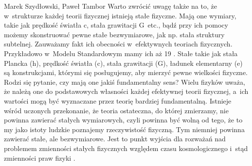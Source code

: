 \begin{artplenv2auth}{Marek Szydłowski, Paweł Tambor}
Warto zwrócić uwagę także na to, że w~strukturze każdej teorii fizycznej istnieją stałe fizyczne. Mają one wymiary, takie jak prędkość światła c, stała grawitacji G~etc., bądź przy ich pomocy możemy skonstruować pewne stałe bezwymiarowe, jak np. stała struktury subtelnej. Zauważamy fakt ich obecności w~efektywnych teoriach fizycznych. Przykładowo w~Modelu Standardowym mamy ich aż 19
\parencite[][]{duff_how_2014}. %
 Stałe takie jak stała Plancka (h), prędkość światła (c), stała grawitacji (G), ładunek elementarny (e) są konstrukcjami, którymi się posługujemy, aby mierzyć pewne wielkości fizyczne. Rodzi się pytanie, czy mają one jakiś fundamentalny sens? Wielu fizyków uważa, że należą one do podstawowych własności każdej efektywnej teorii fizycznej, a~ich wartości mogą być wyznaczane przez teorię bardziej fundamentalną. Istnieje wśród uczonych przekonanie, że teoria ostateczna, do której zmierzamy, nie powinna zawierać stałych wymiarowych, czyli powinna być wolną od tego, że to my jako istoty ludzkie poznajemy rzeczywistość fizyczną. Tym niemniej powinna zawierać stałe, ale bezwymiarowe. Jest to punkt wyjścia dla rozważań nad problemem zmienności stałych fizycznych względem czasu kosmologicznego i~stąd zmienności praw fizyki 
\parencite[][]{volovik_fundamental_2002}.%



\end{artplenv2auth}
